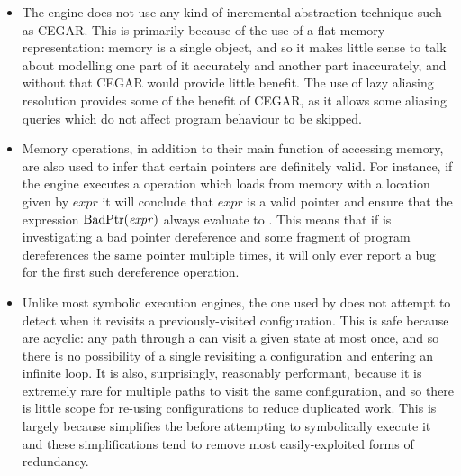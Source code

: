 \begin{itemize}

\item The engine does not use any kind of incremental abstraction
  technique such as CEGAR\cite{Clarke2000}.  This is primarily because
  of the use of a flat memory representation: memory is a single
  object, and so it makes little sense to talk about modelling one
  part of it accurately and another part inaccurately, and without
  that CEGAR would provide little benefit.  The use of lazy aliasing
  resolution provides some of the benefit of CEGAR, as it allows some
  aliasing queries which do not affect program behaviour to be
  skipped.

\item Memory operations, in addition to their main function of
  accessing memory, are also used to infer that certain pointers are
  definitely valid.  For instance, if the engine executes a
   operation which loads from memory with a location given
  by $\mathit{expr}$ it will conclude that $\mathit{expr}$ is a valid
  pointer and ensure that the expression $\mathrm{BadPtr}(\mathit{expr})$
  always evaluate to {\false}.  This means that if {\technique} is
  investigating a bad pointer dereference and some fragment of program
  dereferences the same pointer multiple times, it will only ever
  report a bug for the first such dereference operation.

\item Unlike most symbolic execution engines, the one used by
  {\implementation} does not attempt to detect when it revisits a
  previously-visited configuration.  This is safe because
  {\StateMachines} are acyclic: any path through a {\StateMachine} can
  visit a given state at most once, and so there is no possibility of
  a single revisiting a configuration and entering an infinite loop.
  It is also, surprisingly, reasonably performant, because it is
  extremely rare for multiple paths to visit the same configuration,
  and so there is little scope for re-using configurations to reduce
  duplicated work.  This is largely because {\technique} simplifies
  the {\StateMachine} before attempting to symbolically execute it and
  these simplifications tend to remove most easily-exploited forms of
  redundancy.
\end{itemize}

